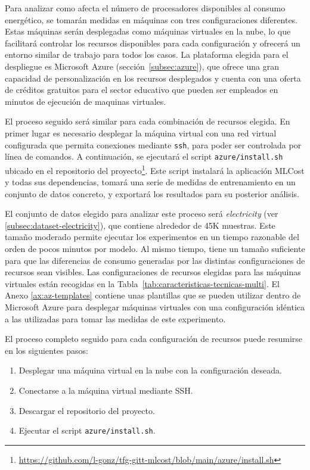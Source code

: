 Para analizar como afecta el número de procesadores disponibles al consumo energético, se tomarán medidas en máquinas con tres configuraciones diferentes. Estas máquinas serán desplegadas como máquinas virtuales en la nube, lo que facilitará controlar los recursos disponibles para cada configuración y ofrecerá un entorno similar de trabajo para todos los casos. La plataforma elegida para el despliegue es Microsoft Azure (sección~\ref{subsec:azure}), que ofrece una gran capacidad de personalización en los recursos desplegados y cuenta con una oferta de créditos gratuitos para el sector educativo que pueden ser empleados en minutos de ejecución de maquinas virtuales.

El proceso seguido será similar para cada combinación de recursos elegida. En primer lugar es necesario desplegar la máquina virtual con una red virtual configurada que permita conexiones mediante \texttt{ssh}, para poder ser controlada por línea de comandos. A continuación, se ejecutará el script \texttt{azure/install.sh} ubicado en el repositorio del proyecto\footnote{\url{https://github.com/l-gonz/tfg-gitt-mlcost/blob/main/azure/install.sh}}. Este script instalará la aplicación MLCost y todas sus dependencias, tomará una serie de medidas de entrenamiento en un conjunto de datos concreto, y exportará los resultados para su posterior análisis.

El conjunto de datos elegido para analizar este proceso será \emph{electricity} (ver \ref{subsec:dataset-electricity}), que contiene alrededor de 45K muestras. Este tamaño moderado permite ejecutar los experimentos en un tiempo razonable del orden de pocos minutos por modelo. Al mismo tiempo, tiene un tamaño suficiente para que las diferencias de consumo generadas por las distintas configuraciones de recursos sean visibles.
Las configuraciones de recursos elegidas para las máquinas virtuales están recogidas en la Tabla~\ref{tab:caracteristicas-tecnicas-multi}. El Anexo \ref{ax:az-templates} contiene unas plantillas que se pueden utilizar dentro de Microsoft Azure para desplegar máquinas virtuales con una configuración idéntica a las utilizadas para tomar las medidas de este experimento.

El proceso completo seguido para cada configuración de recursos puede resumirse en los siguientes pasos:
\begin{enumerate}
    \item Desplegar una máquina virtual en la nube con la configuración deseada.
    \item Conectarse a la máquina virtual mediante SSH.
    \item Descargar el repositorio del proyecto.
    \item Ejecutar el script \texttt{azure/install.sh}.
\end{enumerate}


